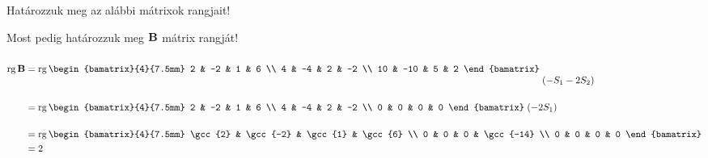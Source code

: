 \begin{exercise}{Határozzuk meg az alábbi mátrixok rangjait!}
{    \tcbline

    Most pedig határozzuk meg $\mathbf{B}$ mátrix rangját!
    \begin{align*}
      \rg \rmat B
       & = \rg
      \begin{bamatrix}{4}{7.5mm}
        2  & -2  & 1 & 6  \\
        4  & -4  & 2 & -2 \\
        10 & -10 & 5 & 2
      \end{bamatrix}
      \;
      \begin{matrix}
        \\\\(-S_1 - 2S_2)
      \end{matrix}
      \\
       & = \rg
      \begin{bamatrix}{4}{7.5mm}
        2  & -2  & 1 & 6  \\
        4  & -4  & 2 & -2 \\
        0 & 0 & 0 & 0
      \end{bamatrix}
      \;
      \begin{matrix}
        \\(-2S_1)\\\,
      \end{matrix}
      \\
       & = \rg
      \begin{bamatrix}{4}{7.5mm}
        \gcc{2} & \gcc{-2} & \gcc{1} & \gcc{6}   \\
        0       & 0        & 0       & \gcc{-14} \\
        0       & 0        & 0       & 0
      \end{bamatrix}
      \\
       & =2
    \end{align*}
  }
\end{exercise}
